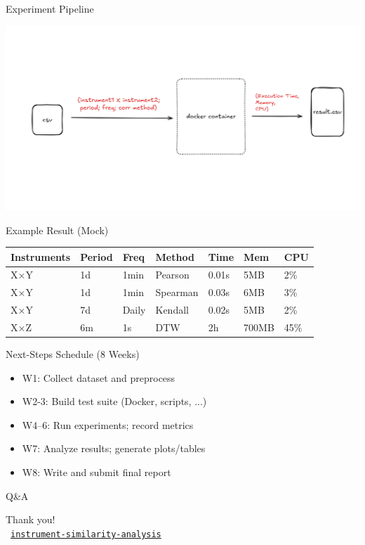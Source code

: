 \documentclass[10pt]{beamer}
\begin{document}
\begin{frame}{Experiment Pipeline}
\begin{center}
  \includegraphics[width=0.9\linewidth]{diagram.png}
\end{center}
\end{frame}


\begin{frame}{Example Result (Mock)}
\begin{tabular}{|l|l|l|l|l|l|l|}
\hline
Instruments & Period & Freq & Method & Time & Mem & CPU \\
\hline
X×Y & 1d & 1min & Pearson & 0.01s & 5MB & 2\% \\
X×Y & 1d & 1min & Spearman & 0.03s & 6MB & 3\% \\
X×Y & 7d & Daily & Kendall & 0.02s & 5MB & 2\% \\
X×Z & 6m & 1s & DTW & 2h & 700MB & 45\% \\
\hline
\end{tabular}
\end{frame}

\begin{frame}{Next-Steps Schedule (8 Weeks)}
\begin{itemize}
  \item W1: Collect dataset and preprocess
  \item W2-3: Build test suite (Docker, scripts, ...)
  \item W4--6: Run experiments; record metrics
  \item W7: Analyze results; generate plots/tables
  \item W8: Write and submit final report
\end{itemize}
\end{frame}

\begin{frame}{Q\&A}
\begin{center}
Thank you! \\[0.5cm]
\faGithub\ \href{https://github.com/enricopizzol/instrument-similarity-analysis}{\texttt{instrument-similarity-analysis}}
\end{center}
\end{frame}
\end{document}

